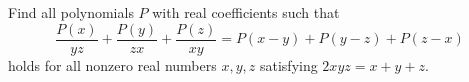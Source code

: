 Find all polynomials $P$ with real coefficients such that \[\frac{P(x)}{yz}+\frac{P(y)}{zx}+\frac{P(z)}{xy}=P(x-y)+P(y-z)+P(z-x)\] holds for all nonzero real numbers $x,y,z$ satisfying $2xyz=x+y+z$.
